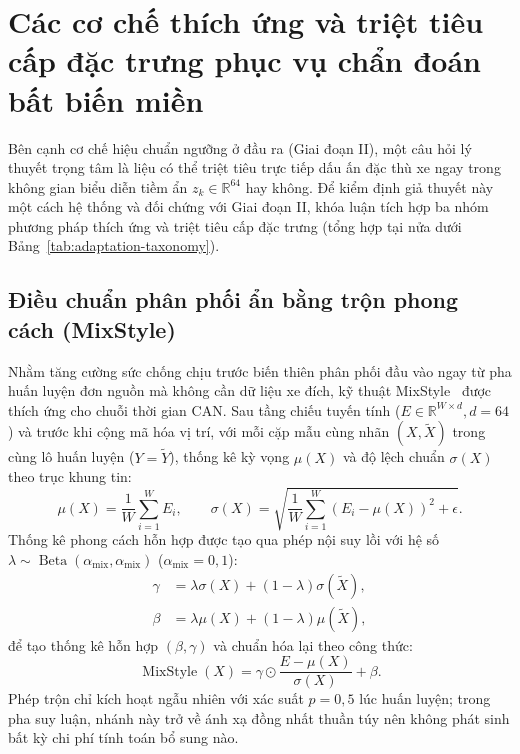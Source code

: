 \documentclass[12pt, a4paper, reqno, oneside]{book}
\begin{document}
\section{Các cơ chế thích ứng và triệt tiêu cấp đặc trưng phục vụ chẩn đoán bất biến miền}\label{sec:domain-adaptation-methods}
Bên cạnh cơ chế hiệu chuẩn ngưỡng ở đầu ra (Giai đoạn II), một câu hỏi lý thuyết trọng tâm là liệu có thể triệt tiêu trực tiếp dấu ấn đặc thù xe ngay trong không gian biểu diễn tiềm ẩn $z_k \in \mathbb{R}^{64}$ hay không. Để kiểm định giả thuyết này một cách hệ thống và đối chứng với Giai đoạn II, khóa luận tích hợp ba nhóm phương pháp thích ứng và triệt tiêu cấp đặc trưng (tổng hợp tại nửa dưới Bảng~\ref{tab:adaptation-taxonomy}).

\subsection{Điều chuẩn phân phối ẩn bằng trộn phong cách (MixStyle)}\label{subsec:method-mixstyle}
Nhằm tăng cường sức chống chịu trước biến thiên phân phối đầu vào ngay từ pha huấn luyện đơn nguồn mà không cần dữ liệu xe đích, kỹ thuật MixStyle~\cite{zhou2021mixstyle} được thích ứng cho chuỗi thời gian CAN. Sau tầng chiếu tuyến tính ($E \in \mathbb{R}^{W \times d}, d = 64$) và trước khi cộng mã hóa vị trí, với mỗi cặp mẫu cùng nhãn $(X, \widetilde{X})$ trong cùng lô huấn luyện ($Y = \widetilde{Y}$), thống kê kỳ vọng $\mu(X)$ và độ lệch chuẩn $\sigma(X)$ theo trục khung tin:
\begin{equation}
\mu(X) = \frac{1}{W}\sum_{i=1}^W E_i, \qquad \sigma(X) = \sqrt{\frac{1}{W}\sum_{i=1}^W (E_i - \mu(X))^2 + \epsilon}.
\end{equation}
Thống kê phong cách hỗn hợp được tạo qua phép nội suy lồi với hệ số $\lambda \sim \operatorname{Beta}(\alpha_{\text{mix}}, \alpha_{\text{mix}})$ ($\alpha_{\text{mix}} = 0{,}1$):
\begin{align}
\gamma &= \lambda \sigma(X) + (1 - \lambda) \sigma(\widetilde{X}),\\
\beta &= \lambda \mu(X) + (1 - \lambda) \mu(\widetilde{X}),
\end{align}
để tạo thống kê hỗn hợp $(\beta, \gamma)$ và chuẩn hóa lại theo công thức:
\begin{equation}
\operatorname{MixStyle}(X) = \gamma \odot \frac{E - \mu(X)}{\sigma(X)} + \beta.
\end{equation}
Phép trộn chỉ kích hoạt ngẫu nhiên với xác suất $p = 0{,}5$ lúc huấn luyện; trong pha suy luận, nhánh này trở về ánh xạ đồng nhất thuần túy nên không phát sinh bất kỳ chi phí tính toán bổ sung nào.
\end{document}
